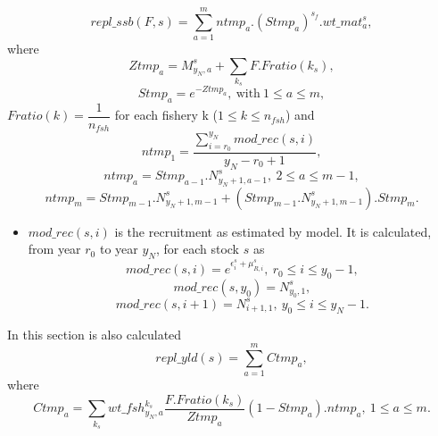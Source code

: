 \documentclass{article}
\begin{document}
\begin{equation}
    repl\_ssb(F,s)=\sum_{a=1}^m ntmp_a. (Stmp_a)^{s_f}.wt\_mat^s_a,
\end{equation}
where
\begin{equation}
    Ztmp_a=M^s_{y_N,a}+\sum_{k_s}F.Fratio(k_s),
\end{equation}
\begin{equation}
    Stmp_a=e^{-Ztmp_a}, \ \text{with} \ 1\leq a \leq m,
\end{equation}
$Fratio(k)=\dfrac{1}{n_{fsh}}$ for each fishery k ($1\leq k \leq n_{fsh}$)
and
\begin{equation}
    ntmp_1 = \dfrac{\displaystyle\sum_{i=r_0}^{y_N} {mod\_rec}(s,i)}{{y_N}-r_0+1},
\end{equation}
\begin{equation}
    ntmp_a=Stmp_{a-1}.N^s_{y_N+1,{a-1}}, \ 2\leq a\leq m-1,
\end{equation}
\begin{equation}
    ntmp_{m}=Stmp_{m-1}.N^s_{y_N+1,m-1}+(Stmp_{m-1}.N^s_{y_N+1,m-1}).Stmp_{m}.
\end{equation}
\begin{itemize}
    \item  $mod\_rec(s,i)$ is the recruitment as estimated by model. It is calculated, from year $r_0$ to year $y_N$, for each stock $s$ as
     \begin{equation}
        mod\_rec(s,i)=e^{\epsilon^s_i+\mu^s_{R,i}}, \ r_0\leq i \leq y_0-1,
    \end{equation}
    \begin{equation}
        mod\_rec(s,y_0)=N^s_{y_0,1},
    \end{equation}
    \begin{equation}
        mod\_rec(s,i+1)=N^s_{i+1,1}, \ y_0\leq i \leq y_N-1.
    \end{equation}
   
\end{itemize}
In this section is also calculated
\begin{equation}
    repl\_yld(s)=\sum_{a=1}^m Ctmp_a,
\end{equation}
where
\begin{equation}
    Ctmp_a=\sum_{k_s} wt\_fsh^{k_s}_{y_N,a}\dfrac{F.Fratio(k_s)}{Ztmp_a}(1-Stmp_a).ntmp_a, \ 1\leq a \leq m.
\end{equation}
\end{document}

